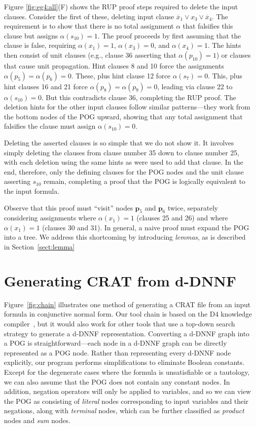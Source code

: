 \documentclass[letterpaper,USenglish,cleveref, autoref, thm-restate]{lipics-v2021}
\newcommand{\obar}[1]{\overline{#1}}
\newcommand{\assign}{\alpha}
\newcommand{\makenode}[1]{\mathbf{#1}}
\newcommand{\nodep}{\makenode{p}}
\newcommand{\progname}[1]{\textsc{#1}}
\newcommand{\dfour}{\progname{D4}}
\begin{document}
Figure \ref{fig:eg4:all}(F) shows the RUP proof steps required to
delete the input clauses.  Consider the first of these, deleting
input clause $\obar{x}_1 \lor x_3 \lor \obar{x}_4$.  The requirement is to show
that there is no total assignment $\assign$ that falsifies this clause but assigns $\assign(s_{10}) = 1$.
The proof proceeds by first assuming that the clause is false, requiring
$\assign(x_1) = 1$, $\assign(x_3) = 0$, and $\assign(x_4) = 1$.  The hints then consist of unit
clauses (e.g., clause 36 asserting that $\alpha(p_{10}) = 1$) or
clauses that cause unit propagation.  Hint clauses 8 and 10 force the
assignments $\assign(p_5) = \assign(p_6) = 0$.  These, plus hint clause 12 force
$\assign(s_7) = 0$.  This, plus hint clauses 16 and 21 force $\assign(p_8) = \assign(p_9) = 0$, leading
via clause 22 to $\assign(s_{10}) = 0$.  But this contradicts clause 36,
completing the RUP proof.  The deletion hints for the other input
clauses follow similar patterns---they work from the bottom nodes of
the POG upward, showing that any total assignment that falsifies the clause
must assign $\assign(s_{10}) = 0$.

Deleting the asserted clauses is so simple that we do not show it.  It
involves simply deleting the clauses from clause number 35 down to
clause number 25, with each deletion using the same hints as were used
to add that clause.  In the end, therefore, only the defining clauses
for the POG nodes and the unit clause asserting $s_{10}$ remain,
completing a proof that the POG is logically equivalent to the input
formula.

Observe that this proof must ``visit'' nodes
$\nodep_5$ and $\nodep_6$ twice, separately considering  assignments where $\assign(x_1) = 1$
(clauses 25 and 26) and where $\assign(x_1) = 1$ (clauses 30 and 31).  In
general, a naive proof must expand the POG into a tree.
We address this shortcoming by introducing {\em lemmas}, as is described in Section~\ref{sect:lemma}


\section{Generating CRAT from d-DNNF}
\label{section:generating:crat}

Figure~\ref{fig:chain} illustrates one method of generating a CRAT
file from an input formula in conjunctive normal form.  Our tool chain
is based on the \dfour{} knowledge compiler~\cite{lagniez:ijcai:2017},
but it would also work for other tools that use a top-down search
strategy to generate a d-DNNF representation.  Converting a d-DNNF
graph into a POG is straightforward---each node in a d-DNNF graph can
be directly represented as a POG node.  Rather than representing every
d-DNNF node explicitly, our program performs simplifications to
eliminate Boolean constants.
Except for the degenerate cases
where the formula is unsatisfiable or a tautology, we can also assume
that the POG does not contain any constant nodes.
In addition, negation operators will
only be applied to variables, and so we can view the POG as consisting
of {\em literal} nodes corresponding to input variables and their negations, along with
{\em terminal} nodes, which can be further classified as {\em product} nodes and {\em sum} nodes.
\end{document}
